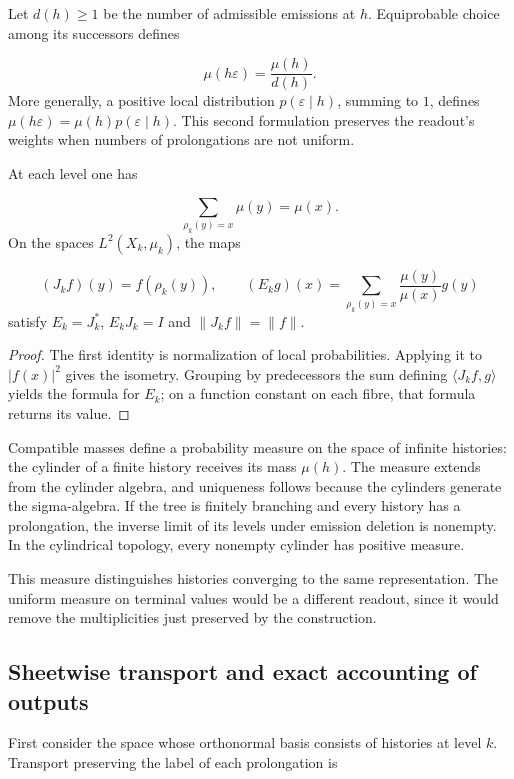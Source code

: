 Let \(d(h)\geq1\) be the number of admissible emissions at \(h\). Equiprobable choice among its successors defines

\[
\mu(h\varepsilon)=\frac{\mu(h)}{d(h)}.
\]
More generally, a positive local distribution \(p(\varepsilon\mid h)\), summing to \(1\), defines \(\mu(h\varepsilon)=\mu(h)p(\varepsilon\mid h)\). This second formulation preserves the readout's weights when numbers of prolongations are not uniform.

\begin{proposition}
\label{iv:cont:esperanza}
At each level one has

\[
\sum_{\rho_k(y)=x}\mu(y)=\mu(x).
\]
On the spaces \(L^2(X_k,\mu_k)\), the maps

\[
(J_kf)(y)=f(\rho_k(y)),
\qquad
(E_kg)(x)=\sum_{\rho_k(y)=x}\frac{\mu(y)}{\mu(x)}g(y)
\]
satisfy \(E_k=J_k^*\), \(E_kJ_k=I\) and \(\|J_kf\|=\|f\|\).

\end{proposition}
\begin{proof}
The first identity is normalization of local probabilities. Applying it to \(|f(x)|^2\) gives the isometry. Grouping by predecessors the sum defining \(\langle J_kf,g\rangle\) yields the formula for \(E_k\); on a function constant on each fibre, that formula returns its value.
\end{proof}

Compatible masses define a probability measure on the space of infinite histories: the cylinder of a finite history receives its mass \(\mu(h)\). The measure extends from the cylinder algebra, and uniqueness follows because the cylinders generate the sigma-algebra. If the tree is finitely branching and every history has a prolongation, the inverse limit of its levels under emission deletion is nonempty. In the cylindrical topology, every nonempty cylinder has positive measure.

This measure distinguishes histories converging to the same representation. The uniform measure on terminal values would be a different readout, since it would remove the multiplicities just preserved by the construction.

\subsection{Sheetwise transport and exact accounting of outputs}
\label{iv:cont:transporte}
First consider the space whose orthonormal basis consists of histories at level \(k\). Transport preserving the label of each prolongation is

